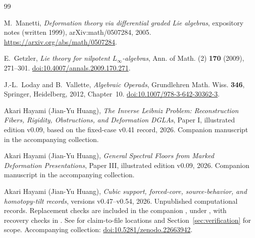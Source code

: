 \documentclass[11pt]{amsart}
\begin{document}
\clearpage
\begin{thebibliography}{99}
\raggedright

M.~Manetti,
\emph{Deformation theory via differential graded Lie algebras},
expository notes (written 1999), arXiv:math/0507284, 2005.
\url{https://arxiv.org/abs/math/0507284}.

E.~Getzler,
\emph{Lie theory for nilpotent $L_\infty$-algebras},
Ann. of Math. (2) \textbf{170} (2009), 271--301.
\href{https://doi.org/10.4007/annals.2009.170.271}{doi:10.4007/annals.2009.170.271}.

J.-L.~Loday and B.~Vallette,
\emph{Algebraic Operads}, Grundlehren Math. Wiss. \textbf{346},
Springer, Heidelberg, 2012, Chapter~10.
\href{https://doi.org/10.1007/978-3-642-30362-3}{doi:10.1007/978-3-642-30362-3}.

Akari Hayami (Jian-Yu Huang),
\emph{The Inverse Leibniz Problem: Reconstruction Fibers, Rigidity, Obstructions, and Deformation DGLAs},
Paper I, illustrated edition v0.09, based on the fixed-case v0.41 record, 2026.
Companion manuscript in the accompanying collection.

Akari Hayami (Jian-Yu Huang),
\emph{General Spectral Floors from Marked Deformation Presentations},
Paper III, illustrated edition v0.09, 2026. Companion manuscript in the accompanying collection.

Akari Hayami (Jian-Yu Huang),
\emph{Cubic support, forced-core, source-behavior, and homotopy-tilt records},
versions v0.47--v0.54, 2026. Unpublished computational records.
Replacement checks are included in the companion
, under
, with recovery checks in
.
See  for claim-to-file locations and
Section~\ref{sec:verification} for scope. Accompanying collection: \href{https://doi.org/10.5281/zenodo.22663942}{doi:10.5281/zenodo.22663942}.
\end{thebibliography}
\end{document}
